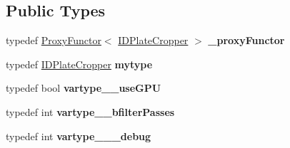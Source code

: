\subsection*{Public Types}
\begin{DoxyCompactItemize}
\item 
\mbox{\label{classfilter_1_1algos_1_1_i_d_plate_cropper_a8fd987b6893bcdec4e3d3df4068f2082}} 
typedef \hyperlink{class_proxy_functor}{Proxy\+Functor}$<$ \hyperlink{classfilter_1_1algos_1_1_i_d_plate_cropper}{I\+D\+Plate\+Cropper} $>$ {\bfseries \+\_\+proxy\+Functor}
\item 
\mbox{\label{classfilter_1_1algos_1_1_i_d_plate_cropper_a905ed1c4871fc5ffbfd999e39e08ccdc}} 
typedef \hyperlink{classfilter_1_1algos_1_1_i_d_plate_cropper}{I\+D\+Plate\+Cropper} {\bfseries mytype}
\item 
\mbox{\label{classfilter_1_1algos_1_1_i_d_plate_cropper_a4bdb50418aed64d913c226109e572425}} 
typedef bool {\bfseries vartype\+\_\+\+\_\+use\+G\+PU}
\item 
\mbox{\label{classfilter_1_1algos_1_1_i_d_plate_cropper_a67405e8caf6bbd909e668339ec5b1ffd}} 
typedef int {\bfseries vartype\+\_\+\+\_\+bfilter\+Passes}
\item 
\mbox{\label{classfilter_1_1algos_1_1_i_d_plate_cropper_a9bd582e8e93628ed0204601a50433a34}} 
typedef int {\bfseries vartype\+\_\+\+\_\+\+\_\+debug}
\end{DoxyCompactItemize}
